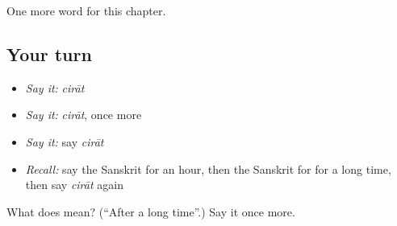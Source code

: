 \begin{grammarlens}[title={What you've built}]
One more word for this chapter.
\end{grammarlens}

\subsection*{Your turn}
\begin{itemize}
\raggedright
  \item \emph{Say it:} \emph{cirāt}
  \item \emph{Say it:} \emph{cirāt}, once more
  \item \emph{Say it:} say \emph{cirāt}
  \item \emph{Recall:} say the Sanskrit for an hour, then the Sanskrit for for a long time, then say \emph{cirāt} again
\end{itemize}

\begin{tcolorbox}[breakable,colback=teal!4,colframe=teal!35!black,title={Before you move on}]
What does  mean? (\textquotedblleft{}After a long time\textquotedblright{}.) Say it once more.
\end{tcolorbox}
